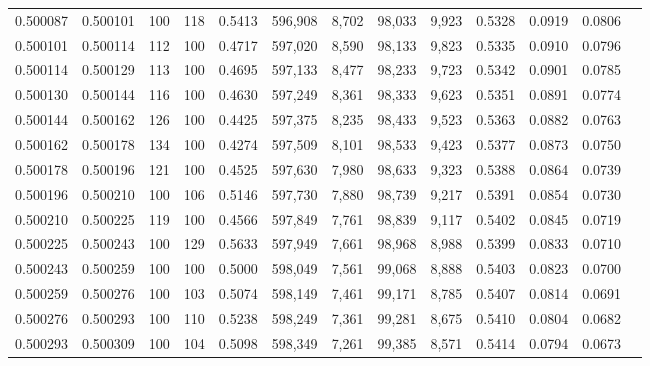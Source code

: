 \begin{tabular}{rrrrrrrrrrrrr}
0.500087 & 0.500101 &   100 & 118 &                                     0.5413 & 596,908 &   8,702 &  98,033 &   9,923 & 0.5328 & 0.0919 & 0.0806 \\
0.500101 & 0.500114 &   112 & 100 &                                     0.4717 & 597,020 &   8,590 &  98,133 &   9,823 & 0.5335 & 0.0910 & 0.0796 \\
0.500114 & 0.500129 &   113 & 100 &                                     0.4695 & 597,133 &   8,477 &  98,233 &   9,723 & 0.5342 & 0.0901 & 0.0785 \\
0.500130 & 0.500144 &   116 & 100 &                                     0.4630 & 597,249 &   8,361 &  98,333 &   9,623 & 0.5351 & 0.0891 & 0.0774 \\
0.500144 & 0.500162 &   126 & 100 &                                     0.4425 & 597,375 &   8,235 &  98,433 &   9,523 & 0.5363 & 0.0882 & 0.0763 \\
0.500162 & 0.500178 &   134 & 100 &                                     0.4274 & 597,509 &   8,101 &  98,533 &   9,423 & 0.5377 & 0.0873 & 0.0750 \\
0.500178 & 0.500196 &   121 & 100 &                                     0.4525 & 597,630 &   7,980 &  98,633 &   9,323 & 0.5388 & 0.0864 & 0.0739 \\
0.500196 & 0.500210 &   100 & 106 &                                     0.5146 & 597,730 &   7,880 &  98,739 &   9,217 & 0.5391 & 0.0854 & 0.0730 \\
0.500210 & 0.500225 &   119 & 100 &                                     0.4566 & 597,849 &   7,761 &  98,839 &   9,117 & 0.5402 & 0.0845 & 0.0719 \\
0.500225 & 0.500243 &   100 & 129 &                                     0.5633 & 597,949 &   7,661 &  98,968 &   8,988 & 0.5399 & 0.0833 & 0.0710 \\
0.500243 & 0.500259 &   100 & 100 &                                     0.5000 & 598,049 &   7,561 &  99,068 &   8,888 & 0.5403 & 0.0823 & 0.0700 \\
0.500259 & 0.500276 &   100 & 103 &                                     0.5074 & 598,149 &   7,461 &  99,171 &   8,785 & 0.5407 & 0.0814 & 0.0691 \\
0.500276 & 0.500293 &   100 & 110 &                                     0.5238 & 598,249 &   7,361 &  99,281 &   8,675 & 0.5410 & 0.0804 & 0.0682 \\
0.500293 & 0.500309 &   100 & 104 &                                     0.5098 & 598,349 &   7,261 &  99,385 &   8,571 & 0.5414 & 0.0794 & 0.0673 \\

\end{tabular}
